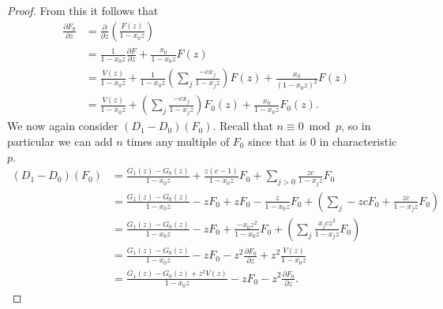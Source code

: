 \documentclass{amsart}
\numberwithin{equation}{section}
\theoremstyle{definition}
\begin{document}
\begin{proof}
From this it follows that
\begin{align*}
\frac{\partial F_0}{\partial z} &= \frac{\partial}{\partial z}\left(\frac{F(z)}{1-x_0z}\right)\\
&=\frac{1}{1-x_0z} \frac{\partial F}{\partial z}+\frac{x_0}{1-x_0z} F(z)\\
&=\frac{V(z)}{1-x_0z}+\frac{1}{1-x_0z}\left(\sum_j \frac{-cx_j}{1-x_jz}\right)F(z)+\frac{x_0}{(1-x_0z)^2} F(z)\\
&=\frac{V(z)}{1-x_0z}+\left(\sum_j \frac{-cx_j}{1-x_jz}\right)F_0(z)+\frac{x_0}{1-x_0z} F_0(z).
\end{align*}
We now again consider $(D_1-D_0)(F_0)$. Recall that $n \equiv 0 \bmod p$, so in particular we can add $n$ times any multiple of $F_0$ since that is $0$ in characteristic $p$. 
\begin{align*}
(D_1-D_0)(F_0)&=\frac{G_1(z)-G_0(z)}{1-x_0z}+\frac{z(c-1)}{1-x_0z}F_0+\sum_{j>0} \frac{zc}{1-x_jz}F_0\\
&=\frac{G_1(z)-G_0(z)}{1-x_0z}-zF_0+zF_0-\frac{z}{1-x_0z}F_0+\left(\sum_{j} -zcF_0+\frac{zc}{1-x_jz}F_0\right)\\
&=\frac{G_1(z)-G_0(z)}{1-x_0z}-zF_0+\frac{-x_0z^2}{1-x_0z}F_0+\left(\sum_{j} \frac{x_jcz^2}{1-x_jz}F_0\right)\\
&=\frac{G_1(z)-G_0(z)}{1-x_0z}-zF_0-z^2\frac{\partial F_0}{\partial z}+z^2\frac{V(z)}{1-x_0z}\\
&=\frac{G_1(z)-G_0(z)+z^2V(z)}{1-x_0z}-zF_0-z^2\frac{\partial F_0}{\partial z}.
\end{align*}


\end{proof}
\end{document}
